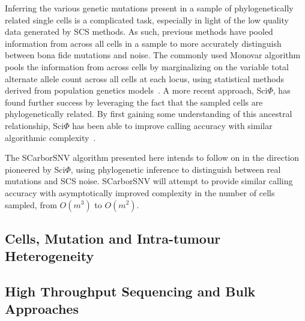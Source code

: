 \documentclass[../main.tex]{subfiles}
\begin{document}
Inferring the various genetic mutations present in a sample of phylogenetically related single cells is a complicated task, especially in light of the low quality data generated by SCS methods.
As such, previous methods have pooled information from across all cells in a sample to more accurately distinguish between bona fide mutations and noise.
The commonly used Monovar algorithm pools the information from across cells by marginalizing on the variable total alternate allele count across all cells at each locus, using statistical methods derived from population genetics models~\cite{monovar}.
A more recent approach, Sci$\Phi$, has found further success by leveraging the fact that the sampled cells are phylogenetically related.
By first gaining some understanding of this ancestral relationship, Sci$\Phi$ has been able to improve calling accuracy with similar algorithmic complexity~\cite{sciphi}.

The SCarborSNV algorithm presented here intends to follow on in the direction pioneered by Sci$\Phi$, using phylogenetic inference to distinguish between real mutations and SCS noise.
SCarborSNV will attempt to provide similar calling accuracy with asymptotically improved complexity in the number of cells sampled, from $O(m^3)$ to $O(m^2)$.

\subsection{Cells, Mutation and Intra-tumour Heterogeneity}


\subsection{High Throughput Sequencing and Bulk Approaches}


 
\end{document}
